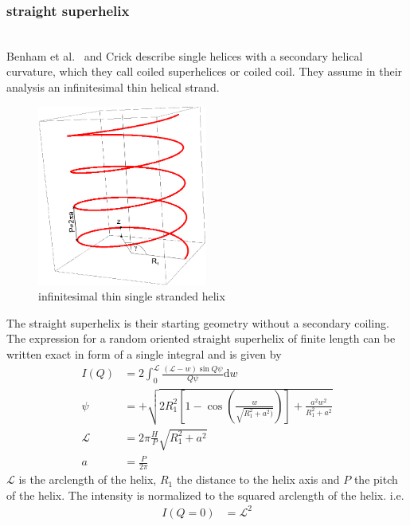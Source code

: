 \newpage
\subsubsection{straight superhelix} ~\\
Benham et al.\ \cite{Benham1980} and Crick \cite{Crick1953} describe single helices with a secondary helical curvature, which they call coiled superhelices or coiled coil. They assume in their analysis an infinitesimal thin helical strand.
\begin{figure}[htb]
\begin{center}
\includegraphics[width=0.497\textwidth,height=0.529\textwidth]{../images/form_factor/cylindrical_obj/straightSuperhelix.png}
\end{center}
\caption{infinitesimal thin single stranded helix} \label{fig:straightsuperhelix}
\end{figure}
 The straight superhelix is their starting geometry without a secondary coiling. The expression for a random oriented straight superhelix of finite length can be written exact in form of a single integral and is given by
\begin{align}
I(Q) &= 2 \int_0^{\mathcal{L}} \frac{(\mathcal{L}-w)\sin Q\psi}{Q\psi} \mathrm{d}w \\
\psi &= + \sqrt{2 R_1^2\left[1-\cos\left(\frac{w}{\sqrt{R_1^2+a^2)}}\right) \right]+\frac{a^2w^2}{R_1^2+a^2}} \\
\mathcal{L} &= 2\pi \frac{H}{P} \sqrt{R_1^2+a^2} \\
a &= \frac{P}{2\pi}
\end{align}
$\mathcal{L}$ is the arclength of the helix, $R_1$ the distance to the helix axis and $P$ the pitch of the helix. The intensity is normalized to the squared arclength of the helix. i.e.
\begin{align}
I(Q=0)&=\mathcal{L}^2
\end{align}

